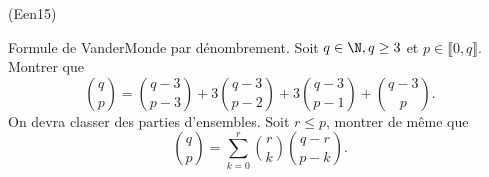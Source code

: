 \begin{tiny}(Een15)\end{tiny} Formule de VanderMonde par dénombrement.\newline
Soit $q\in \N, q\geq3$ et $p\in \llbracket 0, q \rrbracket$. Montrer que
\begin{displaymath}
 \binom{q}{p}
 = \binom{q-3}{p-3} + 3 \binom{q-3}{p-2} + 3\binom{q-3}{p-1} + \binom{q-3}{p}.
\end{displaymath}
On devra classer des parties d'ensembles. Soit $r\leq p$, montrer de même que 
\begin{displaymath}
 \binom{q}{p}
 = \sum_{k=0}^{r}\binom{r}{k}\binom{q-r}{p-k}. 
\end{displaymath}
